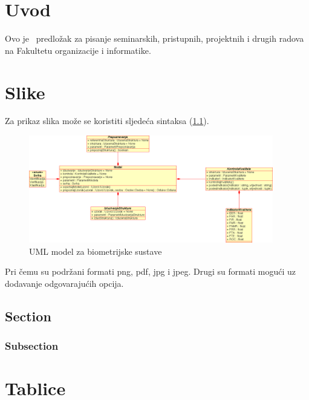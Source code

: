\documentclass[a4paper,12pt]{foi}
\begin{document}
	
\maketitle
\tableofcontents
\thispagestyle{empty}
\setcounter{page}{0}
\onehalfspacing

\chapter{Uvod}

Ovo je \LaTeXe\ predlo\v{z}ak za pisanje seminarskih, pristupnih, projektnih i drugih radova na Fakultetu organizacije i informatike.


\chapter*{Slike}

Za prikaz slika mo\v{z}e se koristiti sljede\'{c}a sintaksa (\ref{slika-1}).

\begin{figure}[h]
\centering 
\includegraphics[width=0.95\textwidth]{model.png}
\caption{UML model za biometrijske sustave \citep{Schatten2008}}
\label{slika-1}
\end{figure}

Pri \v{c}emu su podr\v{z}ani formati png, pdf, jpg i jpeg. Drugi su formati mogu\'{c}i uz dodavanje odgovaraju\'{c}ih opcija.

\section{Section}
\subsection{Subsection}

\chapter{Tablice}
\end{document}
